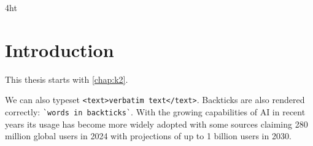 \ifdeutsch
\else
\fi

\printnoidxglossaries

\iftex4ht
\else
\fi



\renewcommand*{\chapterpagestyle}{scrplain}
\pagestyle{scrheadings}
\pagestyle{scrheadings}
\ihead[]{}
\chead[]{}
\ohead[]{\headmark}
\cfoot[]{}
\ifoot[]{}

































%
%


\chapter{Introduction}

This thesis starts with \cref{chap:k2}.

We can also typeset \verb|<text>verbatim text</text>|.
Backticks are also rendered correctly: \verb|`words in backticks`|.
With the growing capabilities of AI in recent years its usage has become more widely adopted with some sources claiming 280 million global users in 2024 \cite{AI-users} with projections of up to 1 billion users in 2030.


